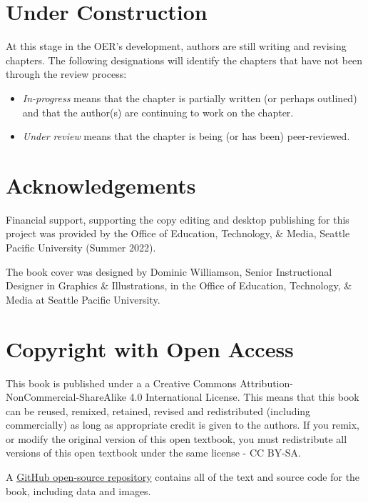 \documentclass[
  11pt,
]{book}
\providecommand{\tightlist}{%
  \setlength{\itemsep}{0pt}\setlength{\parskip}{0pt}}
\begin{document}
\section*{Under Construction}\label{under-construction}


At this stage in the OER's development, authors are still writing and revising chapters. The following designations will identify the chapters that have not been through the review process:

\begin{itemize}
\tightlist
\item
  \emph{In-progress} means that the chapter is partially written (or perhaps outlined) and that the author(s) are continuing to work on the chapter.
\item
  \emph{Under review} means that the chapter is being (or has been) peer-reviewed.
\end{itemize}

\section*{Acknowledgements}\label{acknowledgements}


Financial support, supporting the copy editing and desktop publishing for this project was provided by the Office of Education, Technology, \& Media, Seattle Pacific University (Summer 2022).

The book cover was designed by Dominic Williamson, Senior Instructional Designer in Graphics \& Illustrations, in the Office of Education, Technology, \& Media at Seattle Pacific University.

\section*{Copyright with Open Access}\label{copyright-with-open-access}


This book is published under a a Creative Commons Attribution-NonCommercial-ShareAlike 4.0 International License. This means that this book can be reused, remixed, retained, revised and redistributed (including commercially) as long as appropriate credit is given to the authors. If you remix, or modify the original version of this open textbook, you must redistribute all versions of this open textbook under the same license - CC BY-SA.

A \href{https://github.com/lhbikos/TransformingResearchMethods}{GitHub open-source repository} contains all of the text and source code for the book, including data and images.
\end{document}

